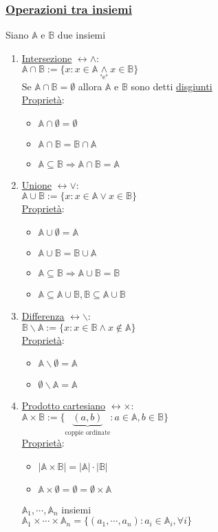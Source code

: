 \documentclass{article}
\newcommand{\ul}[1]{\underline{#1}}
\newcommand{\A}{\mathbb{A}}
\newcommand{\B}{\mathbb{B}}
\begin{document}
\subsubsection*{\color{blue}\ul{Operazioni tra insiemi}}
Siano $\A$ e $\B$ due insiemi
\begin{enumerate}
	\item \ul{Intersezione} \color{violet}$\leftrightarrow\wedge$\color{default}:\\
	  $\A\cap\B:=\{x:x\in\A\underset{\text{"e"}}{\wedge} x\in\B\}$\\
	  Se $\A\cap\B=\emptyset$ allora $\A$ e $\B$ sono detti \ul{disgiunti}\\
	  \ul{Proprietà}:
	  \begin{itemize}
		  \item $\A\cap\emptyset=\emptyset$
		  \item $\A\cap\B=\B\cap\A$
		  \item $\A\subseteq\B\Rightarrow\A\cap\B=\A$
	  \end{itemize}
	\item \ul{Unione} \color{violet}$\leftrightarrow\vee$\color{default}:\\
	  $\A\cup\B:=\{x:x\in\A\vee x\in\B\}$\\
	  \ul{Proprietà}:
	  \begin{itemize}
		  \item $\A\cup\emptyset=\A$
		  \item $\A\cup\B=\B\cup\A$
		  \item $\A\subseteq\B\Rightarrow\A\cup\B=\B$
		  \item $\A\subseteq\A\cup\B,\B\subseteq\A\cup\B$
	  \end{itemize}
	\item \ul{Differenza} \color{violet}$\leftrightarrow\backslash$\color{default}:\\
	  $\B\backslash\A:=\{x:x\in\B\wedge x\not\in\A\}$\\
	  \ul{Proprietà}:
	  \begin{itemize}
		  \item $\A\backslash\emptyset=\A$
		  \item $\emptyset\backslash\A=\A$
	  \end{itemize}
	\item \ul{Prodotto cartesiano} \color{violet}$\leftrightarrow\times$\color{default}:\\
	  $\A\times\B:=\{\underbrace{(a,b)}_{\text{coppie ordinate}}:a\in\A,b\in\B\}$\\
	  \ul{Proprietà}:
	  \begin{itemize}
		  \item $|\A\times\B|=|\A|\cdot|\B|$
		  \item $\A\times\emptyset=\emptyset=\emptyset\times\A$
	  \end{itemize}
	  $\A_1,\cdots,\A_n$ insiemi\\
	  $\A_1\times\cdots\times\A_n=\{(a_1,\cdots,a_n):a_i\in\A_i,\forall i\}$
\end{enumerate}
\end{document}
